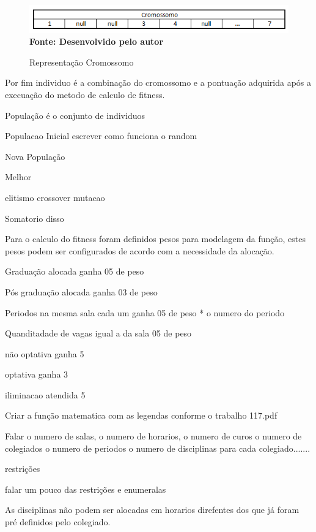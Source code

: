 \documentclass{abntpuc}
\begin{document}
\begin{figure}[!htb]
\caption[Representação Cromossomo]{Representação Cromossomo}
\label{fig:figura1}
\centering
\includegraphics[scale=0.8]{imagens/representacaoCromossomo.png}
\\ \textbf{\footnotesize Fonte: Desenvolvido pelo autor}
\end{figure}

Por fim individuo é a combinação do cromossomo e a pontuação adquirida após a execuação do metodo de calculo de fitness.


População é o conjunto de individuos

Populacao Inicial  escrever como funciona o random

Nova População

Melhor

elitismo
crossover
mutacao

Somatorio disso

Para o calculo do fitness foram definidos pesos para modelagem da função, estes pesos podem ser configurados de acordo com a necessidade da alocação.

Graduação alocada ganha 05 de peso

Pós graduação alocada ganha 03 de peso

Periodos na mesma sala cada um ganha 05 de peso * o numero do periodo

Quanditadade de vagas igual a da sala 05 de peso

não optativa ganha 5

optativa ganha 3

iliminacao atendida 5

Criar a função matematica com as legendas conforme o trabalho 117.pdf

Falar o numero de salas, o numero de horarios, o numero de curos o numero de colegiados o numero de periodos o numero de disciplinas para cada colegiado.......

restrições 


falar um pouco das restrições e enumeralas

As disciplinas não podem ser alocadas em horarios direfentes dos que já foram pré definidos pelo colegiado.
\end{document}
